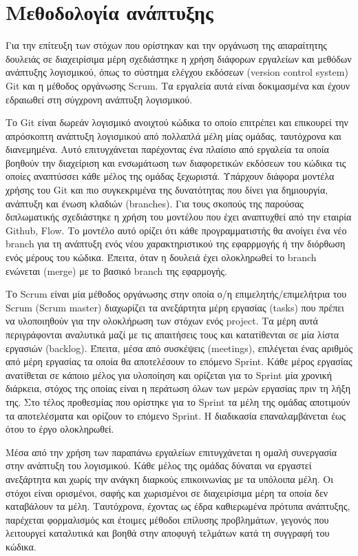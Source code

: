 \section{Μεθοδολογία ανάπτυξης}

Για την επίτευξη των στόχων που ορίστηκαν και την οργάνωση της απαραίτητης δουλειάς σε διαχειρίσιμα μέρη σχεδιάστηκε η χρήση διάφορων εργαλείων και μεθόδων ανάπτυξης λογισμικού, όπως το σύστημα ελέγχου εκδόσεων (version control system) Git και η μέθοδος οργάνωσης Scrum. Τα εργαλεία αυτά είναι δοκιμασμένα και έχουν εδραιωθεί στη σύγχρονη ανάπτυξη λογισμικού.

Το Git είναι δωρεάν λογισμικό ανοιχτού κώδικα το οποίο επιτρέπει και επικουρεί την απρόσκοπτη ανάπτυξη λογισμικού από πολλαπλά μέλη μίας ομάδας, ταυτόχρονα και διανεμημένα. Αυτό επιτυγχάνεται παρέχοντας ένα πλαίσιο από εργαλεία τα οποία βοηθούν την διαχείριση και ενσωμάτωση των διαφορετικών εκδόσεων του κώδικα τις οποίες αναπτύσσει κάθε μέλος της ομάδας ξεχωριστά. Υπάρχουν διάφορα μοντέλα χρήσης του Git και πιο συγκεκριμένα της δυνατότητας που δίνει για δημιουργία, ανάπτυξη και ένωση κλαδιών (branches). Για τους σκοπούς της παρούσας διπλωματικής σχεδιάστηκε η χρήση του μοντέλου που έχει αναπτυχθεί από την εταιρία Github, Flow. Το μοντέλο αυτό ορίζει ότι κάθε προγραμματιστής θα ανοίγει ένα νέο branch για τη ανάπτυξη ενός νέου χαρακτηριστικού της εφαρρμογής ή την διόρθωση ενός μέρους του κώδικα. Έπειτα, όταν η δουλειά έχει ολοκληρωθεί το branch ενώνεται (merge) με το βασικό branch της εφαρμογής.

Το Scrum είναι μία μέθοδος οργάνωσης στην οποία ο/η επιμελητής/επιμελήτρια του Scrum (Scrum master) διαχωρίζει τα ανεξάρτητα μέρη εργασίας (tasks) που πρέπει να υλοποιηθούν για την ολοκλήρωση των στόχων ενός project. Τα μέρη αυτά περιγράφονται αναλυτικά μαζί με τις απαιτήσεις τους και κατατίθενται σε μία λίστα εργασιών (backlog). Έπειτα, μέσα από συσκέψεις (meetings), επιλέγεται ένας αριθμός από μέρη εργασίας τα οποία θα αποτελέσουν το επόμενο Sprint. Κάθε μέρος εργασίας ανατίθεται σε κάποιο μέλος για υλοποίηση και ορίζεται για το Sprint μία χρονική διάρκεια, στόχος της οποίας είναι η περάτωση όλων των μερών εργασίας πριν τη λήξη της. Στο τέλος προθεσμίας που ορίστηκε για το Sprint τα μέλη της ομάδας αποτιμούν τα αποτελέσματα και ορίζουν το επόμενο Sprint. Η διαδικασία επαναλαμβάνεται έως ότου το έργο ολοκληρωθεί.

Μέσα από την χρήση των παραπάνω εργαλείων επιτυγχάνεται η ομαλή συνεργασία στην ανάπτυξη του λογισμικού. Κάθε μέλος της ομάδας δύναται να εργαστεί ανεξάρτητα και χωρίς την ανάγκη διαρκούς επικοινωνίας με τα υπόλοιπα μέλη. Οι στόχοι είναι ορισμένοι, σαφής και χωρισμένοι σε διαχειρίσιμα μέρη τα οποία δεν καταβάλουν τα μέλη. Ταυτόχρονα, έχοντας ως έδρα καθιερωμένα πρότυπα ανάπτυξης, παρέχεται φορμαλισμός και έτοιμες μέθοδοι επίλυσης προβλημάτων, γεγονός που λειτουργεί καταλυτικά και βοηθά στην αποφυγή τελμάτων κατά τη συγγραφή του κώδικα.
